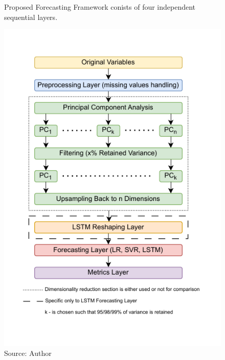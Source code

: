 \begin{figure}[!h]
    \centering
    \caption{Proposed Forecasting Framework conists of 
    four independent sequential layers.}
    \includegraphics[width=1\textwidth]{Figures/Forecasting_framework.drawio.pdf}
    \caption*{Source: Author}
    \label{fig:forecasting_framework}
\end{figure}